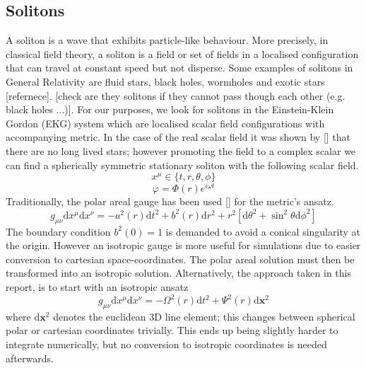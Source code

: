 \documentclass[11pt, oneside]{report}  %
\newcommand{\dd}{\mathrm{d}}
\numberwithin{equation}{section}
\begin{document}
\subsection{Solitons}
A soliton is a wave that exhibits particle-like behaviour. More precisely, in classical field theory, a soliton is a field or set of fields in a localised configuration that can travel at constant speed but not disperse. Some examples of solitons in General Relativity are fluid stars, black holes, wormholes and exotic stars [refernece]. [check are they solitons if they cannot pass though each other (e.g. black holes ...)]. For our purposes, we look for solitons in the Einstein-Klein Gordon (EKG) system which are localised scalar field configurations with accompanying metric. In the case of the real scalar field it was shown by [] that there are no long lived stars; however promoting the field to a complex scalar we can find a spherically symmetric stationary soliton with the following scalar field.
$$ x^\mu \in \{t,r,\theta,\phi \}$$
\begin{equation} \varphi = \Phi(r)e^{i\omega t} \end{equation}
Traditionally, the polar areal gauge has been used [] for the metric's ansatz.
\begin{equation}g_{\mu\nu}\dd x^\mu \dd x^\nu =- a^2(r)\dd t^2 + b^2(r) \dd r^2 + r^2 \left[ \dd \theta^2 + \sin^2\theta \dd \phi^2\right]\end{equation}
The boundary condition $b^2(0)=1$ is demanded to avoid a conical singularity at the origin. However an isotropic gauge is more useful for simulations due to easier conversion to cartesian space-coordinates. The polar areal solution must then be transformed into an isotropic solution. Alternatively, the approach taken in this report, is to start with an isotropic ansatz
\begin{equation} g_{\mu\nu}\dd x^\mu \dd x^\nu =- \Omega^2(r)\dd t^2 + \Psi^2(r)\dd \bm{x}^2\end{equation}
where $\dd \bm{x}^2$ denotes the euclidean 3D line element; this changes between spherical polar or cartesian coordinates trivially. This ends up being slightly harder to integrate numerically, but no conversion to isotropic coordinates is needed afterwards.
\end{document}
